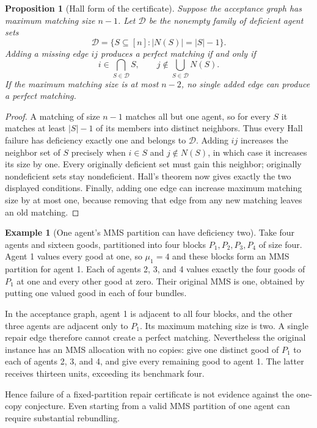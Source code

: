 \documentclass[11pt]{article}
\newtheorem{proposition}{Proposition}
\theoremstyle{definition}
\newtheorem{example}{Example}
\theoremstyle{remark}
\begin{document}
\begin{proposition}[Hall form of the certificate]
Suppose the acceptance graph has maximum matching size $n-1$. Let $\mathcal D$ be the nonempty family of deficient agent sets
\[
 \mathcal D=\{S\subseteq[n]:|N(S)|=|S|-1\}.
\]
Adding a missing edge $i j$ produces a perfect matching if and only if
\[
 i\in\bigcap_{S\in\mathcal D}S,
 \qquad j\notin\bigcup_{S\in\mathcal D}N(S).
\]
If the maximum matching size is at most $n-2$, no single added edge can produce a perfect matching.
\end{proposition}
\begin{proof}
A matching of size $n-1$ matches all but one agent, so for every $S$ it matches at least $|S|-1$ of its members into distinct neighbors. Thus every Hall failure has deficiency exactly one and belongs to $\mathcal D$. Adding $i j$ increases the neighbor set of $S$ precisely when $i\in S$ and $j\notin N(S)$, in which case it increases its size by one. Every originally deficient set must gain this neighbor; originally nondeficient sets stay nondeficient. Hall's theorem now gives exactly the two displayed conditions. Finally, adding one edge can increase maximum matching size by at most one, because removing that edge from any new matching leaves an old matching.
\end{proof}

\begin{example}[One agent's MMS partition can have deficiency two]
Take four agents and sixteen goods, partitioned into four blocks $P_1,P_2,P_3,P_4$ of size four. Agent 1 values every good at one, so $\mu_1=4$ and these blocks form an MMS partition for agent 1. Each of agents 2, 3, and 4 values exactly the four goods of $P_1$ at one and every other good at zero. Their original MMS is one, obtained by putting one valued good in each of four bundles.

In the acceptance graph, agent 1 is adjacent to all four blocks, and the other three agents are adjacent only to $P_1$. Its maximum matching size is two. A single repair edge therefore cannot create a perfect matching. Nevertheless the original instance has an MMS allocation with no copies: give one distinct good of $P_1$ to each of agents 2, 3, and 4, and give every remaining good to agent 1. The latter receives thirteen units, exceeding its benchmark four.

Hence failure of a fixed-partition repair certificate is not evidence against the one-copy conjecture. Even starting from a valid MMS partition of one agent can require substantial rebundling.
\end{example}
\end{document}
